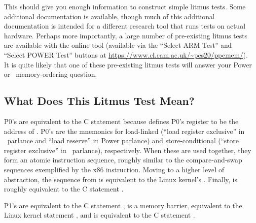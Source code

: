 \begin{fcvref}
\begin{fcvref}
This should give you enough information to construct simple litmus
tests. Some additional documentation is available, though much of this
additional documentation is intended for a different research tool that
runs tests on actual hardware. Perhaps more importantly, a large number of
pre-existing litmus tests are available with the online tool (available
via the ``Select ARM Test'' and ``Select POWER Test'' buttons at
\url{https://www.cl.cam.ac.uk/~pes20/ppcmem/}).
It is quite likely that one of these pre-existing litmus tests will
answer your Power or \ARM\ memory-ordering question.

\fi

\subsection{What Does This Litmus Test Mean?}
\label{sec:formal:What Does This Litmus Test Mean?}

P0's  are equivalent to the C statement 
because  defines P0's register  to be the address
of . P0's  are the mnemonics for
load-linked (``load register
exclusive'' in \ARM\ parlance and ``load reserve'' in Power parlance)
and store-conditional (``store register exclusive'' in \ARM\ parlance),
respectively. When these are used together, they form an atomic
instruction sequence, roughly similar to the compare-and-swap sequences
exemplified by the x86  instruction. Moving to a higher
level of abstraction, the sequence from 
is equivalent to the Linux kernel's .
Finally,  is
roughly equivalent to the C statement .

P1's  are equivalent to the C statement ,
is a memory barrier, equivalent to the Linux kernel statement ,
and  is equivalent to the C statement .
\end{fcvref}

\end{fcvref}
